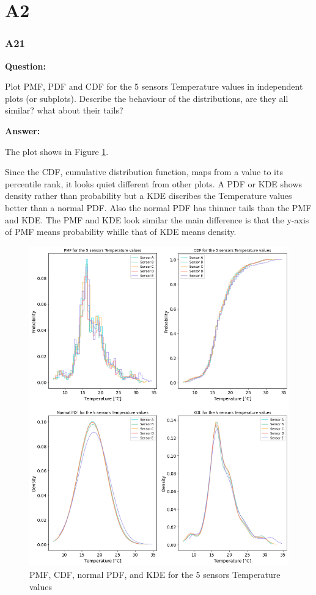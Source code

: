 \documentclass[a4paper]{article}
\numberwithin{figure}{section}
\numberwithin{table}{section}
\begin{document}
\part{A2}

\section{A21}

\textbf{Question:}

Plot PMF, PDF and CDF for the 5 sensors Temperature values in independent plots (or subplots). Describe the behaviour of the distributions, are they all similar? what about their tails?

\textbf{Answer:}

The plot shows in Figure \ref{Fig:A21}.

Since the CDF, cumulative distribution function, maps from a value to its percentile rank, it looks quiet different from other plots. A PDF or KDE shows density rather than probability but a KDE discribes the Temperature values better than a normal PDF. Also the normal PDF has thinner tails than the PMF and KDE. The PMF and KDE look similar the main difference is that the y-axis of PMF means probability whille that of KDE means density.

\begin{figure}
\centering
\includegraphics[scale=0.38]{Figures/figA21.png}
\caption{PMF, CDF, normal PDF, and KDE for the 5 sensors Temperature values}
\label{Fig:A21}
\end{figure}
\end{document}
